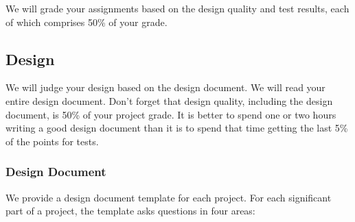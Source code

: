 We will grade your assignments based on the design quality and test results, each of which comprises
50\% of your grade.

\subsection{Design}

We will judge your design based on the design document. We will read your entire design document.
Don’t forget that design quality, including the design document, is 50\% of your project grade. 
It is better to spend one or two hours writing a good design document than it is to spend that time
getting the last 5\% of the points for tests.

\subsubsection{Design Document}

We provide a design document template for each project. For each significant part of a
project, the template asks questions in four areas:

